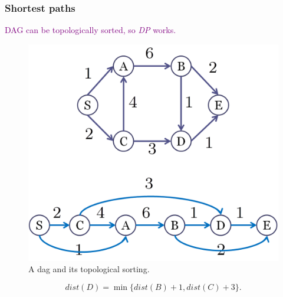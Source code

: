 \begin{frame}
  \frametitle{Shortest paths}

  \textcolor{purple}{DAG can be topologically sorted, so \emph{DP} works.}

  \begin{figure}
    \begin{center}
      \includegraphics[scale=0.30]{figure/bfs_dfs/daglinear}
      \caption{{\scriptsize A dag and its topological sorting.}}
      \label{fig:daglinear}
    \end{center}
  \end{figure}

  \[
    dist(D) = \min \lbrace dist(B)+1, dist(C)+3 \rbrace.
  \]

\end{frame}


